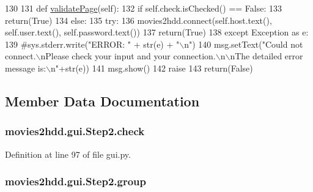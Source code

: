 \begin{DoxyCode}
130 
131     \textcolor{keyword}{def }\hyperlink{classmovies2hdd_1_1gui_1_1_step2_a5c46ff531c08753f9dca56f3e15717c0}{validatePage}(self):
132         \textcolor{keywordflow}{if} self.check.isChecked() == \textcolor{keyword}{False}:
133             return(\textcolor{keyword}{True})
134         \textcolor{keywordflow}{else}:
135             \textcolor{keywordflow}{try}:
136                 movies2hdd.connect(self.host.text(), self.user.text(), self.password.text())
137                 return(\textcolor{keyword}{True})
138             \textcolor{keywordflow}{except} Exception \textcolor{keyword}{as} e:
139                 \textcolor{comment}{#sys.stderr.write("ERROR: " + str(e) + "\(\backslash\)n")}
140                 msg.setText(\textcolor{stringliteral}{"Could not connect.\(\backslash\)nPlease check your input and your connection.\(\backslash\)n\(\backslash\)nThe
       detailed error message is:\(\backslash\)n"}+str(e))
141                 msg.show()
142                 \textcolor{keywordflow}{raise}
143                 return(\textcolor{keyword}{False})

\end{DoxyCode}


\subsection{Member Data Documentation}
\hypertarget{classmovies2hdd_1_1gui_1_1_step2_af460b9a80cc6f30892480537debd47f9}{
\subsubsection[{check}]{\setlength{\rightskip}{0pt plus 5cm}movies2hdd.\-gui.\-Step2.\-check}}\label{classmovies2hdd_1_1gui_1_1_step2_af460b9a80cc6f30892480537debd47f9}


Definition at line 97 of file gui.\-py.

\hypertarget{classmovies2hdd_1_1gui_1_1_step2_ac4656ee08d1176420516f83a856b0799}{
\subsubsection[{group}]{\setlength{\rightskip}{0pt plus 5cm}movies2hdd.\-gui.\-Step2.\-group}}\label{classmovies2hdd_1_1gui_1_1_step2_ac4656ee08d1176420516f83a856b0799}



